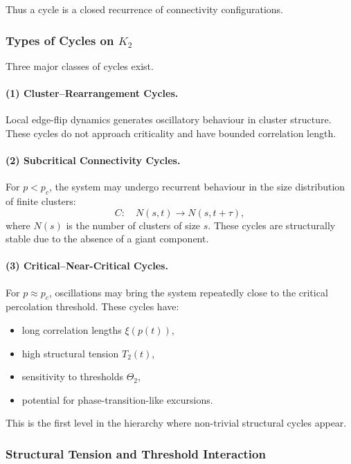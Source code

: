 Thus a cycle is a closed recurrence of connectivity configurations.

\subsubsection{Types of Cycles on \texorpdfstring{$K_2$}{K_2}}

Three major classes of cycles exist.

\paragraph{(1) Cluster–Rearrangement Cycles.}
Local edge-flip dynamics generates oscillatory behaviour in cluster
structure.
These cycles do not approach criticality and have bounded correlation
length.

\paragraph{(2) Subcritical Connectivity Cycles.}
For $p<p_c$, the system may undergo recurrent behaviour in the size
distribution of finite clusters:
\[
  C: \quad
  N(s,t) \to N(s,t+\tau),
\]
where $N(s)$ is the number of clusters of size $s$.
These cycles are structurally stable due to the absence of a giant
component.

\paragraph{(3) Critical–Near-Critical Cycles.}
For $p\approx p_c$, oscillations may bring the system repeatedly close
to the critical percolation threshold.
These cycles have:

\begin{itemize}
  \item long correlation lengths $\xi(p(t))$,
  \item high structural tension $T_2(t)$,
  \item sensitivity to thresholds $\Theta_2$,
  \item potential for phase-transition-like excursions.
\end{itemize}

This is the first level in the hierarchy where non-trivial structural
cycles appear.

\subsubsection{Structural Tension and Threshold Interaction}

